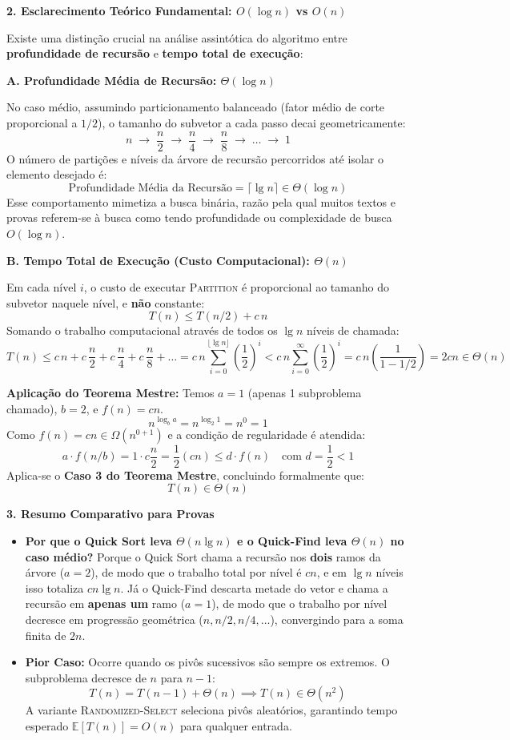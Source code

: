 \documentclass[11pt,a4paper]{article}
\newcommand{\res}[1]{\[\boxed{#1}\]}
\newcommand{\topico}[1]{\par\medskip\textbf{\color{azul}#1}\par}
\newcommand{\subtopico}[1]{\par\smallskip\textbf{#1}\par}
\begin{document}
\topico{2. Esclarecimento Teórico Fundamental: $O(\log n)$ vs $O(n)$}
Existe uma distinção crucial na análise assintótica do algoritmo entre \textbf{profundidade de recursão} e \textbf{tempo total de execução}:

\subtopico{A. Profundidade Média de Recursão: $\Theta(\log n)$}
No caso médio, assumindo particionamento balanceado (fator médio de corte proporcional a $1/2$), o tamanho do subvetor a cada passo decai geometricamente:
\[
n \;\longrightarrow\; \frac{n}{2} \;\longrightarrow\; \frac{n}{4} \;\longrightarrow\; \frac{n}{8} \;\longrightarrow\; \dots \;\longrightarrow\; 1
\]
O número de partições e níveis da árvore de recursão percorridos até isolar o elemento desejado é:
\res{\text{Profundidade Média da Recursão} = \lceil \lg n \rceil \in \Theta(\log n)}
Esse comportamento mimetiza a busca binária, razão pela qual muitos textos e provas referem-se à busca como tendo profundidade ou complexidade de busca $O(\log n)$.

\subtopico{B. Tempo Total de Execução (Custo Computacional): $\Theta(n)$}
Em cada nível $i$, o custo de executar \textsc{Partition} é proporcional ao tamanho do subvetor naquele nível, e \textbf{não} constante:
\[
T(n) \le T(n/2) + c\,n
\]
Somando o trabalho computacional através de todos os $\lg n$ níveis de chamada:
\[
T(n) \le c\,n + c\,\frac{n}{2} + c\,\frac{n}{4} + c\,\frac{n}{8} + \dots = c\,n \sum_{i=0}^{\lfloor \lg n \rfloor} \left(\frac{1}{2}\right)^i < c\,n \sum_{i=0}^{\infty} \left(\frac{1}{2}\right)^i = c\,n \left(\frac{1}{1 - 1/2}\right) = 2cn \in \Theta(n)
\]

\textbf{Aplicação do Teorema Mestre:}
Temos $a = 1$ (apenas 1 subproblema chamado), $b = 2$, e $f(n) = cn$.
\[
n^{\log_b a} = n^{\log_2 1} = n^0 = 1
\]
Como $f(n) = cn \in \Omega(n^{0+1})$ e a condição de regularidade é atendida:
\[
a \cdot f(n/b) = 1 \cdot c\frac{n}{2} = \frac{1}{2}(cn) \le d \cdot f(n) \quad \text{com } d = \frac{1}{2} < 1
\]
Aplica-se o \textbf{Caso 3 do Teorema Mestre}, concluindo formalmente que:
\res{T(n) \in \Theta(n)}

\topico{3. Resumo Comparativo para Provas}
\begin{itemize}
  \item \textbf{Por que o Quick Sort leva $\Theta(n \lg n)$ e o Quick-Find leva $\Theta(n)$ no caso médio?}
  Porque o Quick Sort chama a recursão nos \textbf{dois} ramos da árvore ($a = 2$), de modo que o trabalho total por nível é $c n$, e em $\lg n$ níveis isso totaliza $c n \lg n$. Já o Quick-Find descarta metade do vetor e chama a recursão em \textbf{apenas um} ramo ($a = 1$), de modo que o trabalho por nível decresce em progressão geométrica ($n, n/2, n/4, \dots$), convergindo para a soma finita de $2n$.
  \item \textbf{Pior Caso:} Ocorre quando os pivôs sucessivos são sempre os extremos. O subproblema decresce de $n$ para $n-1$:
  \[
  T(n) = T(n-1) + \Theta(n) \implies T(n) \in \Theta(n^2)
  \]
  A variante \textsc{Randomized-Select} seleciona pivôs aleatórios, garantindo tempo esperado $\mathbb{E}[T(n)] = O(n)$ para qualquer entrada.
\end{itemize}
\end{document}
